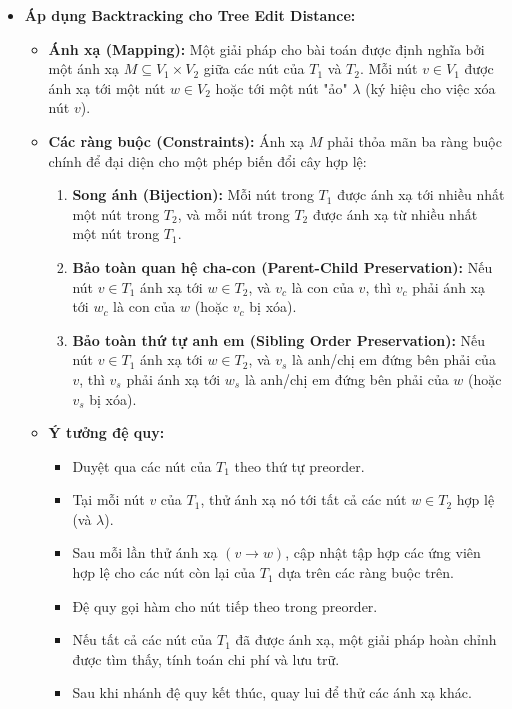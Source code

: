 \documentclass{article}
\begin{document}
\begin{itemize}
    \item \textbf{Áp dụng Backtracking cho Tree Edit Distance:}
    \begin{itemize}
        \item \textbf{Ánh xạ (Mapping):} Một giải pháp cho bài toán được định nghĩa bởi một ánh xạ $M \subseteq V_1 \times V_2$ giữa các nút của $T_1$ và $T_2$. Mỗi nút $v \in V_1$ được ánh xạ tới một nút $w \in V_2$ hoặc tới một nút "ảo" $\lambda$ (ký hiệu cho việc xóa nút $v$).
        \item \textbf{Các ràng buộc (Constraints):} Ánh xạ $M$ phải thỏa mãn ba ràng buộc chính để đại diện cho một phép biến đổi cây hợp lệ:
            \begin{enumerate}
                \item \textbf{Song ánh (Bijection):} Mỗi nút trong $T_1$ được ánh xạ tới nhiều nhất một nút trong $T_2$, và mỗi nút trong $T_2$ được ánh xạ từ nhiều nhất một nút trong $T_1$.
                \item \textbf{Bảo toàn quan hệ cha-con (Parent-Child Preservation):} Nếu nút $v \in T_1$ ánh xạ tới $w \in T_2$, và $v_c$ là con của $v$, thì $v_c$ phải ánh xạ tới $w_c$ là con của $w$ (hoặc $v_c$ bị xóa).
                \item \textbf{Bảo toàn thứ tự anh em (Sibling Order Preservation):} Nếu nút $v \in T_1$ ánh xạ tới $w \in T_2$, và $v_s$ là anh/chị em đứng bên phải của $v$, thì $v_s$ phải ánh xạ tới $w_s$ là anh/chị em đứng bên phải của $w$ (hoặc $v_s$ bị xóa).
            \end{enumerate}
        \item \textbf{Ý tưởng đệ quy:}
            \begin{itemize}
                \item Duyệt qua các nút của $T_1$ theo thứ tự preorder.
                \item Tại mỗi nút $v$ của $T_1$, thử ánh xạ nó tới tất cả các nút $w \in T_2$ hợp lệ (và $\lambda$).
                \item Sau mỗi lần thử ánh xạ $(v \to w)$, cập nhật tập hợp các ứng viên hợp lệ cho các nút còn lại của $T_1$ dựa trên các ràng buộc trên.
                \item Đệ quy gọi hàm cho nút tiếp theo trong preorder.
                \item Nếu tất cả các nút của $T_1$ đã được ánh xạ, một giải pháp hoàn chỉnh được tìm thấy, tính toán chi phí và lưu trữ.
                \item Sau khi nhánh đệ quy kết thúc, quay lui để thử các ánh xạ khác.
            \end{itemize}
    \end{itemize}
\end{itemize}
\end{document}

